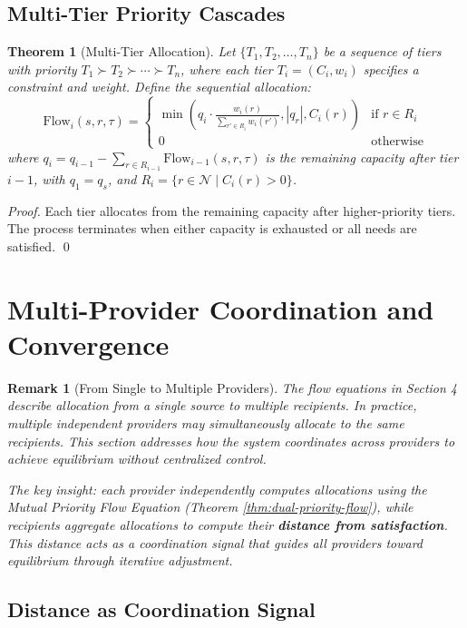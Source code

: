 \documentclass[11pt]{article}
\newtheorem{theorem}{Theorem}
\newtheorem{remark}{Remark}
\begin{document}
\subsection{Multi-Tier Priority Cascades}

\begin{theorem}[Multi-Tier Allocation]
Let $\{T_1, T_2, \ldots, T_n\}$ be a sequence of tiers with priority $T_1 \succ T_2 \succ \cdots \succ T_n$, where each tier $T_i = (C_i, w_i)$ specifies a constraint and weight. Define the sequential allocation:
\[
\text{Flow}_i(s, r, \tau) = \begin{cases}
\min\left( q_i \cdot \frac{w_i(r)}{\sum_{r' \in R_i} w_i(r')}, |q_r|, C_i(r) \right) & \text{if } r \in R_i \\
0 & \text{otherwise}
\end{cases}
\]
where $q_i = q_{i-1} - \sum_{r \in R_{i-1}} \text{Flow}_{i-1}(s, r, \tau)$ is the remaining capacity after tier $i-1$, with $q_1 = q_s$, and $R_i = \{r \in \mathcal{N} \mid C_i(r) > 0\}$.
\end{theorem}

\begin{proof}
Each tier allocates from the remaining capacity after higher-priority tiers. The process terminates when either capacity is exhausted or all needs are satisfied. \qed
\end{proof}

\section{Multi-Provider Coordination and Convergence}

\begin{remark}[From Single to Multiple Providers]
The flow equations in Section 4 describe allocation from a single source to multiple recipients. In practice, multiple independent providers may simultaneously allocate to the same recipients. This section addresses how the system coordinates across providers to achieve equilibrium without centralized control.

The key insight: each provider independently computes allocations using the Mutual Priority Flow Equation (Theorem \ref{thm:dual-priority-flow}), while recipients aggregate allocations to compute their \textbf{distance from satisfaction}. This distance acts as a coordination signal that guides all providers toward equilibrium through iterative adjustment.
\end{remark}

\subsection{Distance as Coordination Signal}
\end{document}
